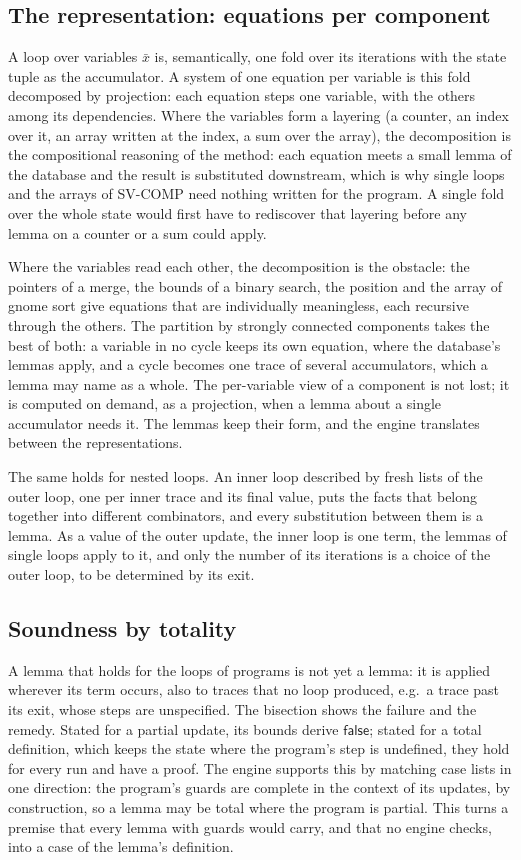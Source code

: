 \subsection{The representation: equations per component}
A loop over variables $\bar x$ is, semantically, one fold over its iterations with the state tuple as the
accumulator. A system of one equation per variable is this fold decomposed by projection: each equation steps one
variable, with the others among its dependencies. Where the variables form a layering (a counter, an index over it, an
array written at the index, a sum over the array), the decomposition is the compositional reasoning of the method: each
equation meets a small lemma of the database and the result is substituted downstream, which is why single loops and
the arrays of SV-COMP need nothing written for the program. A single fold over the whole state would first have to
rediscover that layering before any lemma on a counter or a sum could apply.

Where the variables read each other, the decomposition is the obstacle: the pointers of a merge, the bounds of a
binary search, the position and the array of gnome sort give equations that are individually meaningless, each
recursive through the others. The partition by strongly connected components takes the best of both: a variable in no
cycle keeps its own equation, where the database's lemmas apply, and a cycle becomes one trace of several
accumulators, which a lemma may name as a whole. The per-variable view of a component is not lost; it is computed on
demand, as a projection, when a lemma about a single accumulator needs it. The lemmas keep their form, and the
engine translates between the representations.

The same holds for nested loops. An inner loop described by fresh lists of the outer loop, one per inner trace and its
final value, puts the facts that belong together into different combinators, and every substitution between them is a
lemma. As a value of the outer update, the inner loop is one term, the lemmas of single loops apply to it, and only the
number of its iterations is a choice of the outer loop, to be determined by its exit.

\subsection{Soundness by totality}
A lemma that holds for the loops of programs is not yet a lemma: it is applied wherever its term occurs, also to
traces that no loop produced, e.g.\ a trace past its exit, whose steps are unspecified. The bisection shows the
failure and the remedy. Stated for a partial update, its bounds derive $\mathsf{false}$; stated for a total definition,
which keeps the state where the program's step is undefined, they hold for every run and have a proof. The engine
supports this by matching case lists in one direction: the program's guards are complete in the context of its
updates, by construction, so a lemma may be total where the program is partial. This turns a premise that every lemma
with guards would carry, and that no engine checks, into a case of the lemma's definition.

